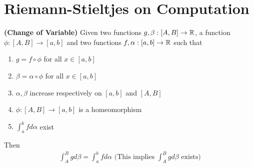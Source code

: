 \documentclass{report}
\begin{document}
\section{Riemann-Stieltjes on Computation}
\begin{theorem}
\label{CoV}
\textbf{(Change of Variable)} Given two functions $g,\beta  :[A,B]\rightarrow \mathbb{R}$, a function $\phi: [A,B]\rightarrow [a,b]$ and two functions $f,\alpha :[a,b]\rightarrow \mathbb{R}$ such that 
\begin{enumerate}[label=(\alph*)]
  \item $g = f \circ  \phi $ for all $x \in [a,b]$
  \item $\beta = \alpha  \circ \phi $ for all $x \in [a,b]$ 
  \item $\alpha , \beta  $ increase respectively on $[a,b]$ and $[A,B]$ 
  \item $\phi:[A,B]\rightarrow [a,b]$ is a homeomorphism 
  \item $\int_a^b fd\alpha $ exist
\end{enumerate}
Then 
\begin{align*}
\int_A^B g d\beta  =\int_a^b fd\alpha \text{   (This implies $\int_A^B gd\beta $ exists)}
\end{align*}
\end{theorem}          
\end{document}
